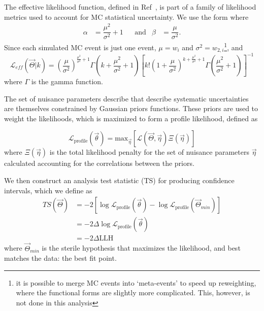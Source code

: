 \documentclass[main.tex]{subfiles}
\begin{document}
The effective likelihood function, defined in Ref~\cite{effective_llh}, is part of a family of likelihood metrics used to account for MC statistical uncertainty. 
We use the form where
\begin{align}
    \alpha&=\dfrac{\mu^{2}}{\sigma^{2}} +1 & &\text{and} & \beta&=\dfrac{\mu}{\sigma^{2}}.
\end{align}
Since each simulated MC event is just one event, $\mu = w_{i}$ and $\sigma^{2} = w_{2,i}$\footnote{it is possible to merge MC events into `meta-events' to speed up reweighting, where the functional forms are slightly more complicated. This, however, is not done in this analysis}, and
\begin{equation}
    \mathcal{L}_{eff}(\vec{\Theta} | k) = \left(\dfrac{\mu}{\sigma^{2}}\right)^{\tfrac{\mu^{2}}{\sigma^{2}} + 1} \Gamma\left(k + \dfrac{\mu^{2}}{\sigma^{2}} + 1\right) \left[ k! \left(1+\dfrac{\mu}{\sigma^{2}}\right)^{k+\tfrac{\mu^{2}}{\sigma^{2}} + 1} \Gamma\left(\dfrac{\mu^{2}}{\sigma^{2}} +1\right)\right]^{-1}
\end{equation}
where $\Gamma$ is the gamma function. 

The set of nuisance parameters describe that describe systematic uncertainties are themselves constrained by Gaussian priors functions. 
These priors are used to weight the likelihoods, which is maximized to form a profile likelihood, defined as 

\begin{equation}
\mathcal{L}_{\text{profile}}\left(\vec{\theta}\right) = \text{max}_{\vec{\eta}}\left[\mathcal{L}(\vec{\Theta}, \vec{\eta}) \Xi(\vec{\eta}) \right]
\end{equation}
where $\Xi(\vec{\eta})$ is the total likelihood penalty for the set of nuisance parameters $\vec{\eta}$ calculated accounting for the correlations between the priors. 

We then construct an analysis test statistic (TS) for producing confidence intervals, which we define as 
\begin{equation}\begin{split}
TS(\vec{\Theta}) &= -2\left[ \log\mathcal{L}_{\text{profile}}(\vec{\theta}) - \log\mathcal{L}_{\text{profile}}(\vec{\Theta}_{min}) \right] \\
&= -2 \Delta \log\mathcal{L}_{\text{profile}}(\vec{\theta})\\
&=-2\Delta \text{LLH}
\end{split}\end{equation}
where $\vec{\Theta}_{min}$ is the sterile hypothesis that maximizes the likelihood, and best matches the data: the best fit point. 
\end{document}

